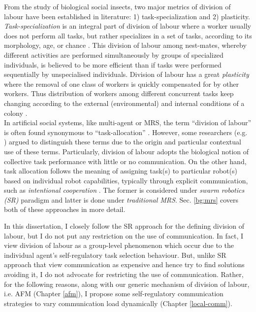 From the study of biological social insects, two major metrics of division of labour have been established in literature: 1) task-specialization and 2) plasticity. {\em Task-specialization} is an integral part of division of labour where a worker usually does not perform all tasks, but rather specializes in a set of tasks, according to its morphology, age, or chance \cite{Bonabeau+1999}. This division of labour among nest-mates, whereby different activities are performed simultaneously by groups of specialized individuals, is believed to be more efficient than if tasks were performed sequentially by unspecialised individuals. Division of labour has a great {\em plasticity} where the removal of one class of workers is quickly compensated for by other workers. Thus distribution of workers among different concurrent tasks keep changing according to the external (environmental) and internal conditions of a colony \cite{Garnier+2007}.\\
In artificial social systems, like multi-agent or MRS, the term ``division of labour'' is often found  synonymous to ``task-allocation'' . However,  some researchers (e.g. \cite{Labella2007}) argued to distinguish these terms due to the origin and particular contextual use of these terms. Particularly,  division of labour adopts the biological notion of collective task  performance with little or no communication. On the other hand, task allocation follows  the meaning of assigning task(s) to particular robot(s) based on individual robot capabilities, typically through explicit communication, such as {\em intentional cooperation} \cite{Parker1998}.  The former is considered under {\em swarm robotics (SR)} paradigm and latter is done under {\em traditional MRS}. Sec. \ref{bg:mrs} covers both of these approaches in more detail. 

In this dissertation, I closely follow the SR approach for the defining division of labour, but I do not put any restriction on the use of communication. In fact, I view division of labour as a group-level phenomenon which occur due to the individual agent's  self-regulatory task selection behaviour. But, unlike  SR approach that view communication as expensive and hence try to find solutions avoiding it, I do not advocate for restricting the  use of communication. Rather, for the following reasons, along with our generic mechanism of division of labour, i.e. AFM (Chapter \ref{afm}), I propose some self-regulatory communication strategies to vary  communication load dynamically (Chapter  \ref{local-comm}). 

